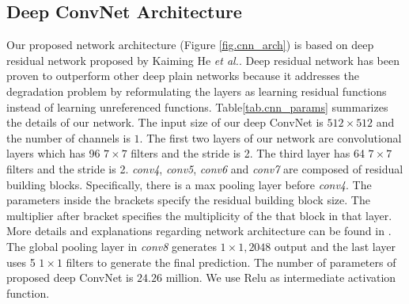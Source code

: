 \subsection{Deep ConvNet Architecture}
\label{sec_cnn}
Our proposed network architecture (Figure \ref{fig.cnn_arch})  is based on deep residual network proposed by Kaiming He \textit{et al.}\cite{he2016deep}. Deep residual  network has been proven to outperform other deep plain networks because it addresses the degradation problem by reformulating the layers as learning residual functions instead of learning unreferenced functions. 
%
Table\ref{tab.cnn_params} summarizes the details of our network. The input size of our deep ConvNet is $512\times512$ and the number of channels is $1$.
The first two layers of our network are convolutional layers which has 96 $7\times7$ filters and the stride is 2. The third layer has 64 $7\times7$ filters and the stride is 2. 
%
\textit{conv4}, \textit{conv5}, \textit{conv6} and \textit{conv7} are composed of residual building blocks. Specifically, there is a max pooling layer before  \textit{conv4}. The parameters inside the brackets specify the residual building block size. 
%
The multiplier after bracket specifies the multiplicity of the that block in that layer.  More details and explanations regarding network architecture can be found in \cite{he2016deep}. 
%
The global pooling layer in \textit{conv8} generates $1\times1,2048$ output and the last layer uses 5 $1\times1$ filters to generate the final prediction. 
%
The number of parameters of proposed deep ConvNet is $24.26$ million. 
%
We use Relu\cite{nair2010rectified} as intermediate activation function.
%

